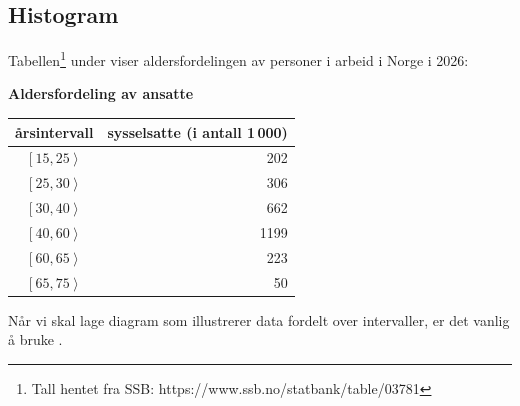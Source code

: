 \subsection*{Histogram}
Tabellen\footnote{Tall hentet fra SSB: https://www.ssb.no/statbank/table/03781} under viser aldersfordelingen av personer i arbeid i Norge i 2026:

\begin{center}
	\textbf{Aldersfordeling av ansatte} \\
	\begin{tabular}{|c | r|}
		\hline
		årsintervall & sysselsatte (i antall 1\,000) \\ \hline
		$\left[15, 25\right\rangle$ & 202 \\ \hline
		$\left[25, 30\right\rangle$ & 306 \\ \hline
		$\left[30, 40\right\rangle$ & 662 \\ \hline
		$\left[40, 60\right\rangle$ & 1199 \\ \hline
		$\left[60, 65\right\rangle$ & 223\\ \hline
		$\left[65, 75\right\rangle$ & 50 \\ \hline
	\end{tabular}
\end{center} \label{histtable}
Når vi skal lage diagram som illustrerer data fordelt over intervaller, er det vanlig å bruke .
\reg[Histogram]{
Gitt et intervall $\left[a, b\right\rangle$ med frekvens $f$. Høyden $h$ til en søyle i et histgram er da gitt ved
\[ h=\frac{f}{b-a} \]
}
\newpage
{}
